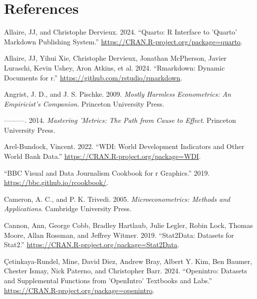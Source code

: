 \documentclass[
  letterpaper,
]{book}
\newlength{\cslhangindent}
\newenvironment{CSLReferences}[2] %
 {\begin{list}{}{%
  \setlength{\itemindent}{0pt}
  \setlength{\leftmargin}{0pt}
  \setlength{\parsep}{0pt}
  \ifodd #1
   \setlength{\leftmargin}{\cslhangindent}
   \setlength{\itemindent}{-1\cslhangindent}
  \fi
  \setlength{\itemsep}{#2\baselineskip}}}
 {\end{list}}
\begin{document}

\chapter*{References}\label{references}


\label{refs}
\begin{CSLReferences}{1}{0}
Allaire, JJ, and Christophe Dervieux. 2024. {``Quarto: R Interface to
'Quarto' Markdown Publishing System.''}
\url{https://CRAN.R-project.org/package=quarto}.

Allaire, JJ, Yihui Xie, Christophe Dervieux, Jonathan McPherson, Javier
Luraschi, Kevin Ushey, Aron Atkins, et al. 2024. {``Rmarkdown: Dynamic
Documents for r.''} \url{https://github.com/rstudio/rmarkdown}.

Angrist, J. D., and J. S. Pischke. 2009. \emph{Mostly Harmless
Econometrics: An Empiricist's Companion}. Princeton University Press.

---------. 2014. \emph{Mastering 'Metrics: The Path from Cause to
Effect}. Princeton University Press.

Arel-Bundock, Vincent. 2022. {``WDI: World Development Indicators and
Other World Bank Data.''} \url{https://CRAN.R-project.org/package=WDI}.

{``BBC Visual and Data Journalism Cookbook for r Graphics.''} 2019.
\url{https://bbc.github.io/rcookbook/}.

Cameron, A. C., and P. K. Trivedi. 2005. \emph{Microeconometrics:
Methods and Applications}. Cambridge University Press.

Cannon, Ann, George Cobb, Bradley Hartlaub, Julie Legler, Robin Lock,
Thomas Moore, Allan Rossman, and Jeffrey Witmer. 2019. {``Stat2Data:
Datasets for Stat2.''}
\url{https://CRAN.R-project.org/package=Stat2Data}.

Çetinkaya-Rundel, Mine, David Diez, Andrew Bray, Albert Y. Kim, Ben
Baumer, Chester Ismay, Nick Paterno, and Christopher Barr. 2024.
{``Openintro: Datasets and Supplemental Functions from 'OpenIntro'
Textbooks and Labs.''}
\url{https://CRAN.R-project.org/package=openintro}.


\end{CSLReferences}
\end{document}
